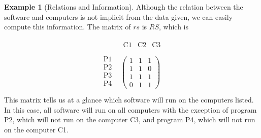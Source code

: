 \documentclass[10pt,]{book}
\theoremstyle{plain}
\theoremstyle{definition}
\theoremstyle{definition}
\theoremstyle{definition}
\newtheorem{example}[theorem]{Example}
\theoremstyle{definition}
\begin{document}
\begin{example}[Relations and Information]
Although the relation between the software and computers is not implicit from the data given, we can easily compute this information. The matrix of \(rs\) is \(RS\), which is

 \begin{equation*}\begin{array}{cc}
   & 
\begin{array}{ccc}
 \text{C1} & \text{C2} & \text{C3} \\
\end{array}
 \\
 
\begin{array}{c}
 \text{P1} \\
 \text{P2} \\
 \text{P3} \\
 \text{P4} \\
\end{array}
 & \left(
\begin{array}{ccc}
  1  &  1  & 1 \\
 1 &  1  & 0 \\
 1 & 1 &  1  \\
 0 &  1  &  1 
\end{array}
\right) \\
\end{array}\end{equation*}
This matrix tells us at a glance which software will run on the computers listed. In this case, all software will run on all computers with the exception of program P2, which will not run on the computer C3, and program P4, which will not run on the computer C1.%
\end{example}
\typeout{************************************************}
\typeout{************************************************}
\end{document}
